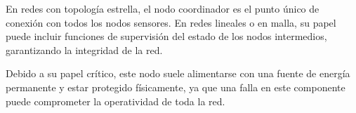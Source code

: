 En redes con topología estrella, el nodo coordinador es el punto único de conexión con todos los nodos sensores. En redes lineales o en malla, su papel puede incluir funciones de supervisión del estado de los nodos intermedios, garantizando la integridad de la red.

Debido a su papel crítico, este nodo suele alimentarse con una fuente de energía permanente y estar protegido físicamente, ya que una falla en este componente puede comprometer la operatividad de toda la red.


